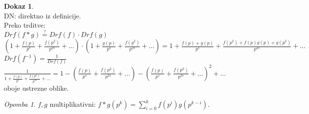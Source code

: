 \documentclass[a4paper, 12pt]{book}
\theoremstyle{definition}
\newtheorem{pro}[counter]{Dokaz}
\theoremstyle{remark}
\newtheorem*{rem}{Opomba}
\begin{document}
\begin{pro} \text{} \\
  DN: direktno iz definicije. \\
  Preko trditve: \\
  $Drf(f * g) \stackrel{?}{=} Drf(f) \cdot Drf(g)$ \\
  $\left(1 + \frac{f(p)}{p^s} + \frac{f(p^2)}{p^{2s}} + \dots \right) \cdot
  \left(1 + \frac{g(p)}{p^s} + \frac{f(g^2)}{p^{2s}} + \dots \right) =
  1 + \frac{f(p) + g(p)}{p^{s}} + \frac{f(p^2) + f(p) g(p) + g(p^2)}{p^{2s}} + \dots$ \\
  $Drf(f^{-1}) = \frac{1}{Drf(f)}$ \\
  $\frac{1}{1 + \frac{f(p)}{p^s} + \frac{f(p^2)}{p^{2s}} + \dots} =
  1 - \left(\frac{f(p)}{p^s} + \frac{f(p^2)}{p^{2s}} + \dots\right) -
  \left(\frac{f(p)}{p^s} + \frac{f(p^2)}{p^{2s}} + \dots\right)^2 + \dots$ \\
  oboje ustrezne oblike.
\end{pro}
\begin{rem}
  $f, g$ multiplikativni: $f * g\left(p^k\right) = \sum_{i=0}^{k} f\left(p^i\right) g\left(p^{k-i}\right)$.
\end{rem}
\end{document}
